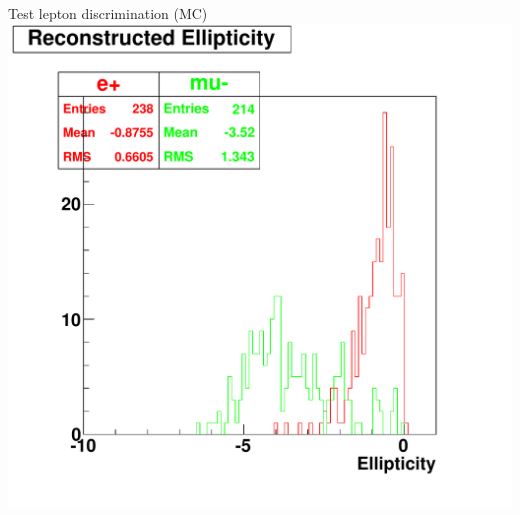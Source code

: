 \documentclass[14pt]{beamer}
\begin{document}
\begin{frame}{Test lepton discrimination (MC)}
	\centering
	\includegraphics[width=0.8\linewidth]{emu_mtq_recon_ellipticity-3Mcut.pdf}
\end{frame}
\end{document}
